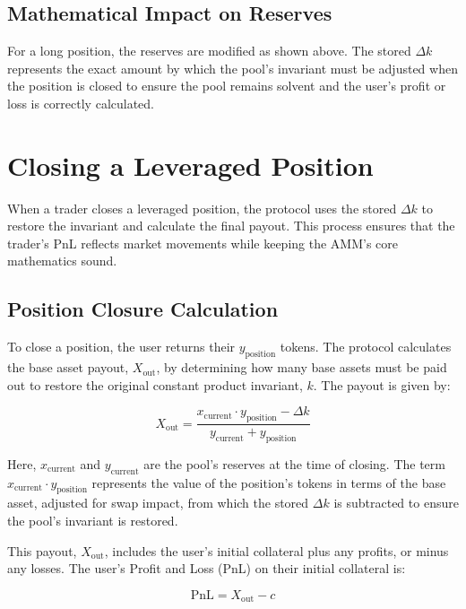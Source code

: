 \documentclass[11pt]{article}
\begin{document}
\subsection{Mathematical Impact on Reserves}

For a long position, the reserves are modified as shown above. The stored $\Delta k$ represents the exact amount by which the pool's invariant must be adjusted when the position is closed to ensure the pool remains solvent and the user's profit or loss is correctly calculated.

\section{Closing a Leveraged Position}

When a trader closes a leveraged position, the protocol uses the stored $\Delta k$ to restore the invariant and calculate the final payout. This process ensures that the trader's PnL reflects market movements while keeping the AMM's core mathematics sound.

\subsection{Position Closure Calculation}

To close a position, the user returns their $y_{\text{position}}$ tokens. The protocol calculates the base asset payout, $X_{\text{out}}$, by determining how many base assets must be paid out to restore the original constant product invariant, $k$. The payout is given by:

\begin{equation}
X_{\text{out}} = \frac{x_{\text{current}} \cdot y_{\text{position}} - \Delta k}{y_{\text{current}} + y_{\text{position}}}
\end{equation}

Here, $x_{\text{current}}$ and $y_{\text{current}}$ are the pool's reserves at the time of closing. The term $x_{\text{current}} \cdot y_{\text{position}}$ represents the value of the position's tokens in terms of the base asset, adjusted for swap impact, from which the stored $\Delta k$ is subtracted to ensure the pool's invariant is restored.

This payout, $X_{\text{out}}$, includes the user's initial collateral plus any profits, or minus any losses. The user's Profit and Loss (PnL) on their initial collateral is:

\begin{equation}
\text{PnL} = X_{\text{out}} - c
\end{equation}
\end{document}
